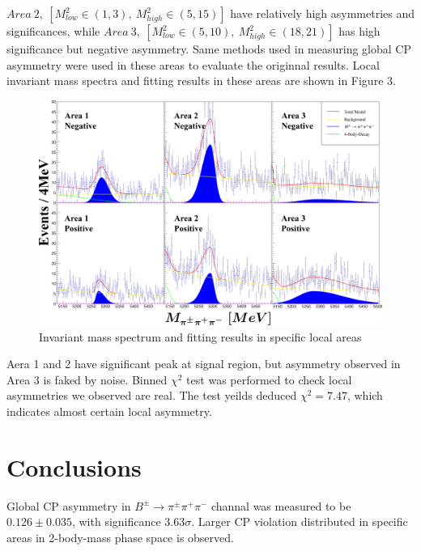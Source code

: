\documentclass[12pt, twoside, notitlepage, twocolumn]{article}
\begin{document}
        $Area\ 2,\ [M^2_{low} \in (1,3),\ M^2_{high}\in(5,15)]$ have relatively high asymmetries and significances, 
        while $Area\ 3,\ [M^2_{low} \in (5,10),\ M^2_{high}\in(18,21)]$ has high significance but negative 
        asymmetry. Same methods used in measuring global CP asymmetry were used in these areas to evaluate 
        the originnal results. Local invariant mass spectra and fitting results in these areas are shown in Figure 3.
        \begin{figure}[!ht]
            \begin{centering}
            \includegraphics[scale=0.185]{ZoomFinal.png}
            \caption{Invariant mass spectrum and fitting results in specific local areas}
            \end{centering}
            \label{fig:label3}
        \end{figure}
        Aera 1 and 2 have significant peak at signal region, but asymmetry observed in Area 3 is faked by noise. Binned $\chi^2$
        test\cite{Parkes:2016yie} was performed to check local asymmetries we observed are real. The test yeilds deduced $\chi^2=7.47$,
        which indicates almost certain local asymmetry. 
        \section{Conclusions}
        Global CP asymmetry in $B^{\pm}\rightarrow\pi^{\pm}\pi^{+}\pi^{-}$ channal was measured to be $0.126\pm0.035$, with significance
        $3.63\sigma$. Larger CP violation distributed in specific areas in 2-body-mass phase space is observed. 
        
        
    
\end{document}
